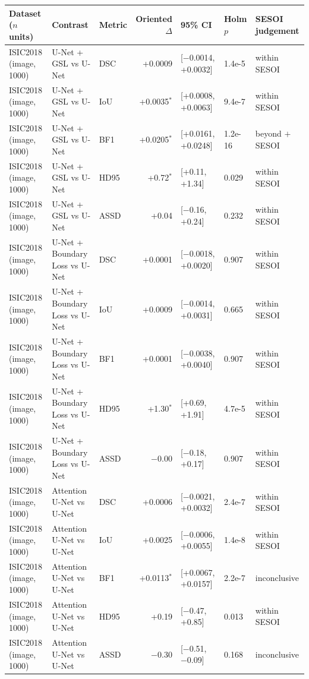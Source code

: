 \begin{tabular}{lllrlll}
\toprule
Dataset ($n$ units) & Contrast & Metric & Oriented $\Delta$ & 95\% CI & Holm $p$ & SESOI judgement \\
\midrule
ISIC2018 (image, 1000) & U-Net + GSL vs U-Net & DSC & +0.0009 & [$-$0.0014, +0.0032] & 1.4e-5 & within SESOI \\
ISIC2018 (image, 1000) & U-Net + GSL vs U-Net & IoU & +0.0035$^{*}$ & [+0.0008, +0.0063] & 9.4e-7 & within SESOI \\
ISIC2018 (image, 1000) & U-Net + GSL vs U-Net & BF1 & +0.0205$^{*}$ & [+0.0161, +0.0248] & 1.2e-16 & beyond $+$SESOI \\
ISIC2018 (image, 1000) & U-Net + GSL vs U-Net & HD95 & +0.72$^{*}$ & [+0.11, +1.34] & 0.029 & within SESOI \\
ISIC2018 (image, 1000) & U-Net + GSL vs U-Net & ASSD & +0.04 & [$-$0.16, +0.24] & 0.232 & within SESOI \\
ISIC2018 (image, 1000) & U-Net + Boundary Loss vs U-Net & DSC & +0.0001 & [$-$0.0018, +0.0020] & 0.907 & within SESOI \\
ISIC2018 (image, 1000) & U-Net + Boundary Loss vs U-Net & IoU & +0.0009 & [$-$0.0014, +0.0031] & 0.665 & within SESOI \\
ISIC2018 (image, 1000) & U-Net + Boundary Loss vs U-Net & BF1 & +0.0001 & [$-$0.0038, +0.0040] & 0.907 & within SESOI \\
ISIC2018 (image, 1000) & U-Net + Boundary Loss vs U-Net & HD95 & +1.30$^{*}$ & [+0.69, +1.91] & 4.7e-5 & within SESOI \\
ISIC2018 (image, 1000) & U-Net + Boundary Loss vs U-Net & ASSD & $-$0.00 & [$-$0.18, +0.17] & 0.907 & within SESOI \\
ISIC2018 (image, 1000) & Attention U-Net vs U-Net & DSC & +0.0006 & [$-$0.0021, +0.0032] & 2.4e-7 & within SESOI \\
ISIC2018 (image, 1000) & Attention U-Net vs U-Net & IoU & +0.0025 & [$-$0.0006, +0.0055] & 1.4e-8 & within SESOI \\
ISIC2018 (image, 1000) & Attention U-Net vs U-Net & BF1 & +0.0113$^{*}$ & [+0.0067, +0.0157] & 2.2e-7 & inconclusive \\
ISIC2018 (image, 1000) & Attention U-Net vs U-Net & HD95 & +0.19 & [$-$0.47, +0.85] & 0.013 & within SESOI \\
ISIC2018 (image, 1000) & Attention U-Net vs U-Net & ASSD & $-$0.30 & [$-$0.51, $-$0.09] & 0.168 & inconclusive \\

\end{tabular}
